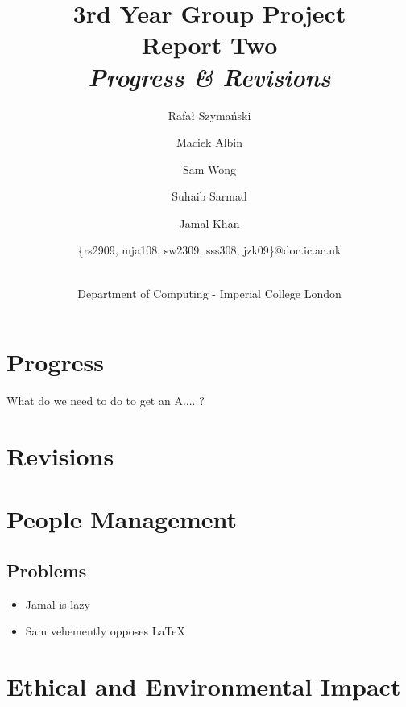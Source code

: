 \documentclass[a4paper,11pt]{article}
\title{3rd Year Group Project\\Report Two\\\emph{Progress \& Revisions}}
\author{
    \small{Rafał Szymański}\\
  	\and
    \small{Maciek Albin}\\
    \and
    \small{Sam Wong}\\
    \and
    \small{Suhaib Sarmad}\\
		\and
		\small{Jamal Khan}\\
		\and
		\small{\{rs2909, mja108, sw2309, sss308, jzk09\}@doc.ic.ac.uk}
		\and
		\\Department of Computing - Imperial College London
}
\date{}
\begin{document}
 
	\maketitle
	
	\section{Progress}
	
	What do we need to do to get an A.... ?
	
	\section{Revisions}
	
	\section{People Management}
	
		\subsection{Problems}
	
		\begin{itemize}
			\item Jamal is lazy
			\item Sam vehemently opposes \LaTeX
		\end{itemize}
	
	
	\section{Ethical and Environmental Impact}	
\end{document}
